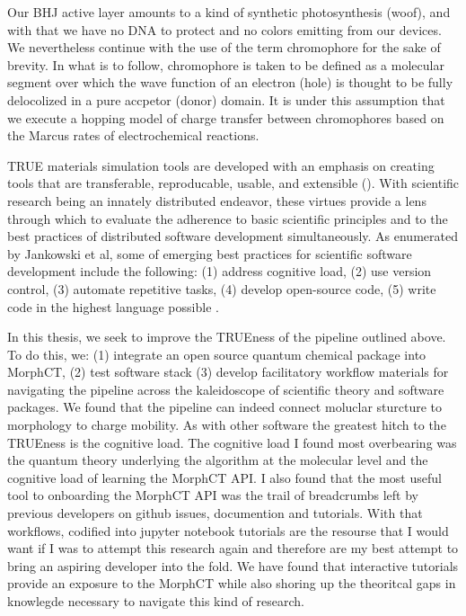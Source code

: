 Our BHJ active layer amounts to a kind of synthetic photosynthesis (woof), and with that we have no DNA to
protect and no colors emitting from our devices. We nevertheless continue with the use of the term chromophore
for the sake of brevity. In what is to follow, chromophore is taken to be defined as a molecular segment over which the 
wave function of an electron (hole) is thought to be fully delocolized in a pure accpetor (donor) domain. 
It is under this assumption that we execute a hopping model of charge transfer between
chromophores based on the Marcus rates of electrochemical reactions.  

TRUE materials simulation tools are developed with an emphasis on creating tools that are
transferable, reproducable, usable, and extensible (\cite{Cummings2017}).
With scientific research being an innately distributed endeavor, these virtues provide a lens through which to
evaluate the adherence to basic scientific principles and to the best practices of distributed software development
simultaneously. As enumerated by Jankowski et al, some of emerging best practices for scientific software
development include the following: (1) address cognitive load, (2) use version control, (3) automate
repetitive tasks, (4) develop open-source code, (5) write code in the highest language possible
\cite{Jankowski2020}.


In this thesis, we seek to improve the TRUEness of the pipeline outlined above.
To do this, we: (1) integrate an open source quantum chemical package into MorphCT,
(2) test software stack (3) develop facilitatory workflow materials for navigating the
pipeline across the kaleidoscope of scientific theory and software packages. 
We found that the pipeline can indeed connect moluclar sturcture to morphology to charge
mobility. As with other software the greatest hitch to the TRUEness is the
cognitive load. The cognitive load I found most overbearing was the quantum theory underlying the algorithm 
at the molecular level and the cognitive load of learning the MorphCT API. 
I also found that the most useful tool to onboarding the MorphCT API was the
trail of breadcrumbs left by previous developers on github issues, documention and tutorials. 
With that workflows, codified into jupyter notebook tutorials are the resourse that I would want if I was to
attempt this research again and therefore are my best attempt to bring an aspiring developer into the fold.
We have found that interactive tutorials provide an exposure to the MorphCT while also shoring up the
theoritcal gaps in knowlegde necessary to navigate this kind of research. 

